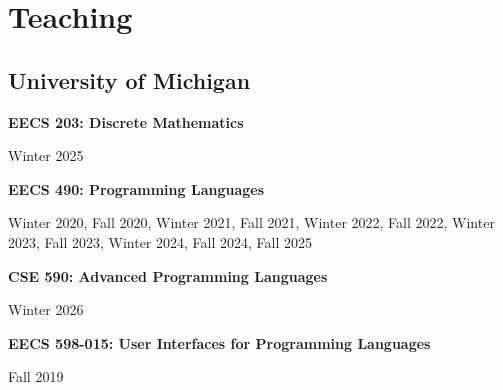 \documentclass[10pt,letterpaper]{article}
\renewenvironment{itemize}{
  \begin{list}{}{
    \setlength{\leftmargin}{1.25em}
    \setlength{\itemsep}{0.25em}
    \setlength{\parskip}{0pt}
    \setlength{\parsep}{0.2em}
  }
}{
  \end{list}
}
\begin{document}
%


\section*{Teaching}
\subsection*{University of Michigan}
\begin{itemize}
  \item \textbf{EECS 203: Discrete Mathematics}
      \begin{itemize}
        \item Winter 2025
      \end{itemize}
  \item \textbf{EECS 490: Programming Languages}
        \begin{itemize}
          \item Winter 2020, Fall 2020, Winter 2021, Fall 2021, Winter 2022, Fall 2022, Winter 2023, Fall 2023, Winter 2024, Fall 2024, Fall 2025
        \end{itemize}
  \item \textbf{CSE 590: Advanced Programming Languages}
        \begin{itemize}
          \item Winter 2026
        \end{itemize}
  \item \textbf{EECS 598-015: User Interfaces for Programming Languages}
        \begin{itemize}
          \item Fall 2019
        \end{itemize}
\end{itemize}
\end{document}
